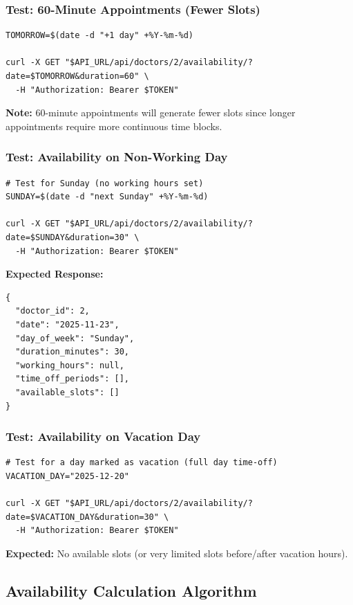 \documentclass[12pt,a4paper]{article}
\begin{document}
\subsubsection{Test: 60-Minute Appointments (Fewer Slots)}
\begin{lstlisting}[style=bash]
TOMORROW=$(date -d "+1 day" +%Y-%m-%d)

curl -X GET "$API_URL/api/doctors/2/availability/?date=$TOMORROW&duration=60" \
  -H "Authorization: Bearer $TOKEN"
\end{lstlisting}

\textbf{Note:} 60-minute appointments will generate fewer slots since longer appointments require more continuous time blocks.

\subsubsection{Test: Availability on Non-Working Day}
\begin{lstlisting}[style=bash]
# Test for Sunday (no working hours set)
SUNDAY=$(date -d "next Sunday" +%Y-%m-%d)

curl -X GET "$API_URL/api/doctors/2/availability/?date=$SUNDAY&duration=30" \
  -H "Authorization: Bearer $TOKEN"
\end{lstlisting}

\textbf{Expected Response:}
\begin{lstlisting}[style=json]
{
  "doctor_id": 2,
  "date": "2025-11-23",
  "day_of_week": "Sunday",
  "duration_minutes": 30,
  "working_hours": null,
  "time_off_periods": [],
  "available_slots": []
}
\end{lstlisting}

\subsubsection{Test: Availability on Vacation Day}
\begin{lstlisting}[style=bash]
# Test for a day marked as vacation (full day time-off)
VACATION_DAY="2025-12-20"

curl -X GET "$API_URL/api/doctors/2/availability/?date=$VACATION_DAY&duration=30" \
  -H "Authorization: Bearer $TOKEN"
\end{lstlisting}

\textbf{Expected:} No available slots (or very limited slots before/after vacation hours).

\subsection{Availability Calculation Algorithm}
\end{document}
